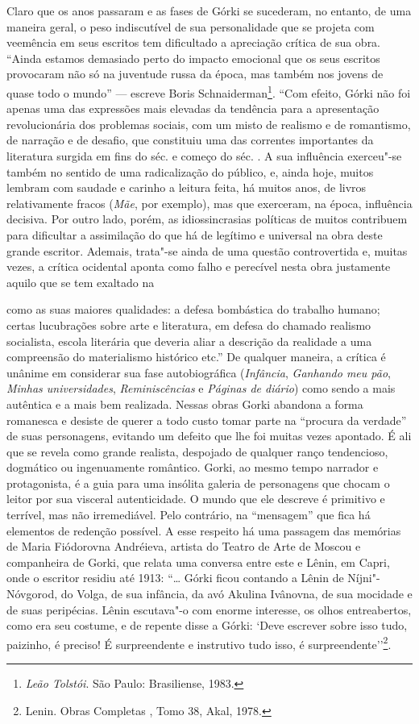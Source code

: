 {{Claro que os anos passaram e as fases de Górki se sucederam, no entanto,
de uma maneira geral, o peso indiscutível de sua personalidade que se
projeta com veemência em seus escritos tem dificultado a apreciação
crítica de sua obra. ``Ainda estamos demasiado perto do impacto
emocional que os seus escritos provocaram não só na juventude russa da
época, mas também nos jovens de quase todo o mundo'' --- escreve Boris
Schnaiderman\footnote{\emph{Leão Tolstói}. São Paulo: Brasiliense, 1983.}. ``Com efeito, Górki não foi apenas uma das expressões
mais elevadas da tendência para a apresentação revolucionária dos
problemas sociais, com um misto de realismo e de romantismo, de narração
e de desafio, que constituiu uma das correntes importantes da literatura
surgida em fins do séc.  e começo do séc. . A sua influência
exerceu"-se também no sentido de uma radicalização do público, e, ainda
hoje, muitos lembram com saudade e carinho a leitura feita, há muitos
anos, de livros relativamente fracos (\emph{Mãe}, por exemplo), mas que
exerceram, na época, influência decisiva. Por outro lado, porém, as
idiossincrasias políticas de muitos contribuem para dificultar a
assimilação do que há de legítimo e universal na obra deste grande
escritor. Ademais, trata"-se ainda de uma questão controvertida e,
muitas vezes, a crítica ocidental aponta como falho e perecível nesta
obra justamente aquilo que se tem exaltado na { como as suas maiores
qualidades: a defesa bombástica do trabalho humano; certas lucubrações
sobre arte e literatura, em defesa do chamado realismo socialista,
escola literária que deveria aliar a descrição da realidade a uma
compreensão do materialismo histórico etc.'' De qualquer maneira, a
crítica é unânime em considerar sua fase autobiográfica
(\emph{Infância}, \emph{Ganhando meu pão}, \emph{Minhas universidades},
\emph{Reminiscências} e \emph{Páginas de diário}) como sendo a mais
autêntica e a mais bem realizada. Nessas obras Gorki abandona a forma
romanesca e desiste de querer a todo custo tomar parte na ``procura da
verdade'' de suas personagens, evitando um defeito que lhe foi muitas
vezes apontado. É ali que se revela como grande realista, despojado de
qualquer ranço tendencioso, dogmático ou ingenuamente romântico. Gorki,
ao mesmo tempo narrador e protagonista, é a guia para uma insólita
galeria de personagens que chocam o leitor por sua visceral
autenticidade. O mundo que ele descreve é primitivo e terrível, mas não
irremediável. Pelo contrário, na ``mensagem'' que fica há elementos de
redenção possível. A esse respeito há uma passagem das memórias de Maria
Fiódorovna Andréieva, artista do Teatro de Arte de Moscou e companheira
de Gorki, que relata uma conversa entre este e Lênin, em Capri, onde o
escritor residiu até 1913: ``\ldots{} Górki ficou contando a Lênin de
Níjni"-Nóvgorod, do Volga, de sua infância, da avó Akulina Ivânovna, de
sua mocidade e de suas peripécias. Lênin escutava"-o com enorme
interesse, os olhos entreabertos, como era seu costume, e de repente
disse a Górki: ‘Deve escrever sobre isso tudo, paizinho, é preciso! É
surpreendente e instrutivo tudo isso, é surpreendente’'\footnote{Lenin. Obras
  Completas , Tomo 38, Akal, 1978.}.

}}}

